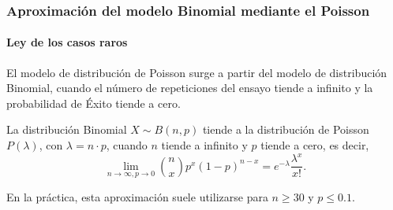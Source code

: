 \begin{frame}
\frametitle{Aproximación del modelo Binomial mediante el Poisson}
\framesubtitle{Ley de los casos raros}
El modelo de distribución de Poisson surge a partir del modelo de distribución Binomial, cuando el número de repeticiones del ensayo tiende a infinito y la probabilidad de Éxito tiende a cero.

\begin{teorema}
La distribución Binomial $X\sim B(n,p)$ tiende a la distribución de Poisson $P(\lambda)$, con $\lambda=n\cdot p$, cuando $n$ tiende a infinito y $p$ tiende a cero, es decir,
\[
  \lim_{n\rightarrow \infty, p\rightarrow 0}\binom{n}{x}p^x(1-p)^{n-x} = e^{-\lambda}\frac{\lambda^x}{x!}.
\]
\end{teorema}

En la práctica, esta aproximación suele utilizarse para $n\geq 30$ y $p\leq 0.1$.

\end{frame}




